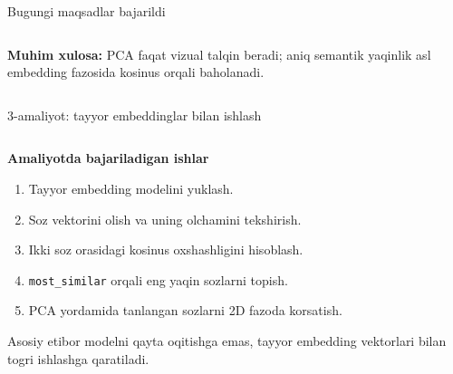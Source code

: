 \documentclass[aspectratio=169,11pt]{beamer}
\begin{document}
\begin{frame}{Bugungi maqsadlar bajarildi}
\begin{columns}[T,totalwidth=\textwidth]
\begin{column}{0.46\textwidth}
\vspace{4pt}

\begin{tcolorbox}[defbox,left=2mm,right=2mm,top=1mm,bottom=1mm]
\scriptsize
\textbf{Muhim xulosa:} PCA faqat vizual talqin beradi;
aniq semantik yaqinlik asl embedding fazosida kosinus orqali baholanadi.
\end{tcolorbox}

\end{column}
\end{columns}

\end{frame}

\begin{frame}{3-amaliyot: tayyor embeddinglar bilan ishlash}
\footnotesize

\begin{columns}[T,totalwidth=\textwidth]
\begin{column}{0.48\textwidth}

\textbf{Amaliyotda bajariladigan ishlar}

\begin{enumerate}\setlength\itemsep{5pt}
  \item Tayyor embedding modelini yuklash.
  \item So\textquotesingle{}z vektorini olish va uning o\textquotesingle{}lchamini tekshirish.
  \item Ikki so\textquotesingle{}z orasidagi kosinus o\textquotesingle{}xshashligini hisoblash.
  \item \texttt{most\_similar} orqali eng yaqin so\textquotesingle{}zlarni topish.
  \item PCA yordamida tanlangan so\textquotesingle{}zlarni 2D fazoda ko\textquotesingle{}rsatish.
\end{enumerate}

\vspace{3pt}

\begin{tcolorbox}[defbox,left=2mm,right=2mm,top=1mm,bottom=1mm]
\scriptsize
Asosiy e\textquotesingle{}tibor modelni qayta o\textquotesingle{}qitishga emas,
tayyor embedding vektorlari bilan to\textquotesingle{}g\textquotesingle{}ri ishlashga qaratiladi.
\end{tcolorbox}

\end{column}


\end{columns}
\end{frame}
\end{document}
